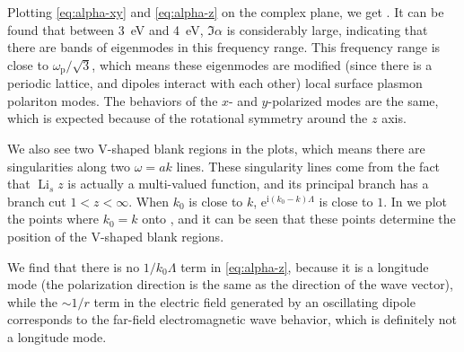 \documentclass[hyperref, a4paper]{article}
\newcommand*{\ii}{\mathrm{i}}
\newcommand*{\ee}{\mathrm{e}}
\DeclareMathOperator{\li}{Li}
\begin{document}
Plotting \eqref{eq:alpha-xy} and \eqref{eq:alpha-z} on the complex plane, we get .
It can be found that between \SI{3}{eV} and \SI{4}{eV}, $\Im \alpha$ is considerably large, indicating that 
there are bands of eigenmodes in this frequency range. This frequency range is close to $\omega_\text{p} / 
\sqrt{3}$, which means these eigenmodes are modified (since there is a periodic lattice, and dipoles interact
with each other) local surface plasmon polariton modes. The behaviors of the $x$- and $y$-polarized modes are 
the same, which is expected because of the rotational symmetry around the $z$ axis.

We also see two V-shaped blank regions in the plots,
which means there are singularities along two $\omega=ak$ lines. These singularity lines come from the fact 
that $\li_s z$ is actually a multi-valued function, and its principal branch has a branch cut $1 < z < \infty$.
When $k_0$ is close to $k$, $\ee^{\ii (k_0 - k) \Lambda}$ is close to $1$. 
In  we plot the points where $k_0 = k$ onto , and it can be 
seen that these points determine the position of the V-shaped blank regions.

We find that there is no $1 / k_0 \Lambda$ term in \eqref{eq:alpha-z}, because it is a longitude mode
(the polarization direction is the same as the direction of the wave vector), while 
the $\sim 1/r$ term in the electric field generated by an oscillating dipole corresponds to the far-field 
electromagnetic wave behavior, which is definitely not a longitude mode. 
\end{document}
